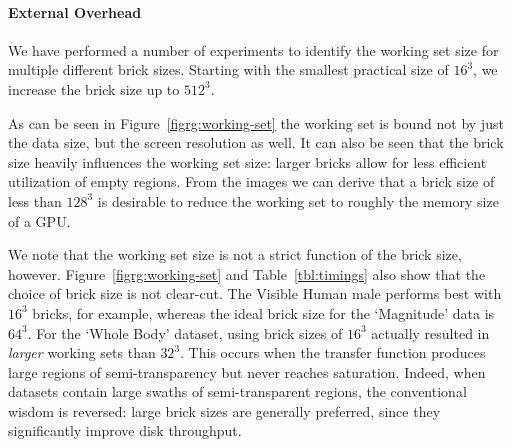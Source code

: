 \paragraph{External Overhead}

We have performed a number of experiments to identify the working set
size for multiple different brick sizes.  Starting with the smallest
practical size of $16^3$, we increase the brick size up to $512^3$.

As can be seen in Figure~\ref{figrg:working-set} the working set is bound
not by just the data size, but the screen resolution as well.  It can
also be seen that the brick size heavily influences the working set
size: larger bricks allow for less efficient utilization of empty
regions. From the images we can derive that a brick size of less than
$128^3$ is desirable to reduce the working set to roughly the memory
size of a GPU.

We note that the working set size is not a strict function of the brick
size, however.  Figure~\ref{figrg:working-set} and
Table~\ref{tbl:timings} also show that the choice of brick size is not
clear-cut.  The Visible Human male performs best with $16^3$ bricks,
for example, whereas the ideal brick size for the `Magnitude' data is
$64^3$.  For the `Whole Body' dataset, using brick sizes of
$16^3$ actually resulted in \emph{larger} working sets than $32^3$.
This occurs when the transfer function produces large regions
of semi-transparency but never reaches saturation.  Indeed, when datasets
contain large swaths of semi-transparent regions, the conventional
wisdom is reversed: large brick sizes are generally preferred, since
they significantly improve disk throughput.

%


